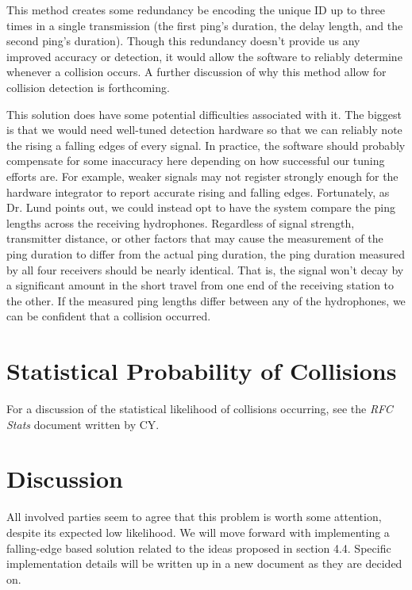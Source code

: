 \documentclass[12pt]{article}
\begin{document}
This method creates some redundancy be encoding the unique ID up to three times
in a single transmission
(the first ping's duration, the delay length, and the second ping's duration).
Though this redundancy doesn't provide us any improved accuracy or detection,
it would allow the software to reliably determine whenever a collision occurs.
A further discussion of why this method allow for collision detection is
forthcoming.


This solution does have some potential difficulties associated with it.
The biggest is that we would need well-tuned detection hardware so that we can
reliably note the rising a falling edges of every signal.
In practice, the software should probably compensate for some inaccuracy here
depending on how successful our tuning efforts are.
For example, weaker signals may not register strongly enough for the hardware
integrator to report accurate rising and falling edges.
Fortunately, as Dr. Lund points out, we could instead opt to have the system
compare the ping lengths across the receiving hydrophones.
Regardless of signal strength, transmitter distance, or other factors that
may cause the measurement of the ping duration to differ from the actual
ping duration, the ping duration measured by all four receivers should be
nearly identical. That is, the signal won't decay by a significant amount
in the short travel from one end of the receiving station to the other.
If the measured ping lengths differ between any of the hydrophones,
we can be confident that a collision occurred.

\section{Statistical Probability of Collisions}

For a discussion of the statistical likelihood of collisions occurring, see
the {\em RFC Stats} document written by CY.

\section{Discussion}

All involved parties seem to agree that this problem is worth some attention,
despite its expected low likelihood.
We will move forward with implementing a falling-edge based solution
related to the ideas proposed in section 4.4.
Specific implementation details will be written up in a new document as they
are decided on.
\end{document}
